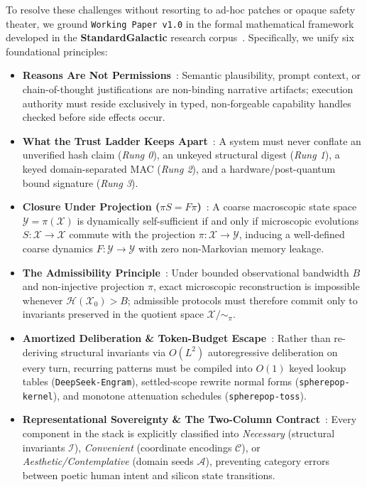 \documentclass[10pt,twocolumn,letterpaper]{article}
\begin{document}
To resolve these challenges without resorting to ad-hoc patches or opaque safety theater, we ground \texttt{Working Paper v1.0} in the formal mathematical framework developed in the \textbf{StandardGalactic} research corpus~\cite{guimond2026admissibility,guimond2026reasons,guimond2026reasonless,guimond2026trustladder,guimond2026closure,guimond2026sufficient,guimond2026amortized,guimond2026representational,guimond2026perpetual,lodri2026wp0}. Specifically, we unify six foundational principles:
\begin{itemize}[leftmargin=1.3em,itemsep=1pt,topsep=2pt]
    \item \textbf{Reasons Are Not Permissions}~\cite{guimond2026reasons,guimond2026reasonless}: Semantic plausibility, prompt context, or chain-of-thought justifications are non-binding narrative artifacts; execution authority must reside exclusively in typed, non-forgeable capability handles checked before side effects occur.
    \item \textbf{What the Trust Ladder Keeps Apart}~\cite{guimond2026trustladder}: A system must never conflate an unverified hash claim (\emph{Rung 0}), an unkeyed structural digest (\emph{Rung 1}), a keyed domain-separated MAC (\emph{Rung 2}), and a hardware/post-quantum bound signature (\emph{Rung 3}).
    \item \textbf{Closure Under Projection ($\pi S = F\pi$)}~\cite{guimond2026closure,guimond2026sufficient}: A coarse macroscopic state space $\mathcal{Y}=\pi(\mathcal{X})$ is dynamically self-sufficient if and only if microscopic evolutions $S:\mathcal{X}\to\mathcal{X}$ commute with the projection $\pi:\mathcal{X}\to\mathcal{Y}$, inducing a well-defined coarse dynamics $F:\mathcal{Y}\to\mathcal{Y}$ with zero non-Markovian memory leakage.
    \item \textbf{The Admissibility Principle}~\cite{guimond2026admissibility}: Under bounded observational bandwidth $B$ and non-injective projection $\pi$, exact microscopic reconstruction is impossible whenever $\mathcal{H}(\mathcal{X}_0) > B$; admissible protocols must therefore commit only to invariants preserved in the quotient space $\mathcal{X}/\!\sim_\pi$.
    \item \textbf{Amortized Deliberation \& Token-Budget Escape}~\cite{guimond2026amortized,guimond2026tokenbudget,guimond2026perpetual}: Rather than re-deriving structural invariants via $O(L^2)$ autoregressive deliberation on every turn, recurring patterns must be compiled into $O(1)$ keyed lookup tables (\texttt{DeepSeek-Engram}), settled-scope rewrite normal forms (\texttt{spherepop-kernel}), and monotone attenuation schedules (\texttt{spherepop-toss}).
    \item \textbf{Representational Sovereignty \& The Two-Column Contract}~\cite{guimond2026representational,lodri2026wp0}: Every component in the stack is explicitly classified into \emph{Necessary} (structural invariants $\mathcal{I}$), \emph{Convenient} (coordinate encodings $\mathcal{C}$), or \emph{Aesthetic/Contemplative} (domain seeds $\mathcal{A}$), preventing category errors between poetic human intent and silicon state transitions.
\end{itemize}
\end{document}
